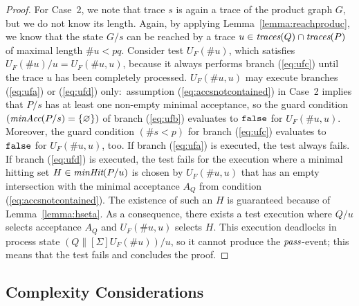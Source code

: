 \begin{proof}
For   Case~2, we note that trace $s$ is again a trace of the product graph
$G$, but we do not know its length. Again, by applying Lemma~\ref{lemma:reachproduc},
we know that the state   $G/s$ can   be reached by a trace
$u\in\text{\it traces}(Q)\cap\text{\it traces}(P)$ of maximal length $\#u < pq$. Consider test $U_F(\#
u)$, which satisfies $U_F(\# u)/u = U_F(\#u,u)$, because it always performs
branch (\ref{eq:ufc}) until the trace $u$ has been completely processed.
$U_F(\#u,u)$ may execute branches (\ref{eq:ufa}) or (\ref{eq:ufd})
only:~assumption (\ref{eq:accsnotcontained}) in Case~2 implies that $P/s$ has
at least one non-empty minimal acceptance, so the guard condition 
$(\text{\it minAcc}(P/s) = \{ \varnothing \})$ 
of branch (\ref{eq:ufb}) evaluates to $\mbox{{\tt false}}$ for $U_F(\#u,u)$.
Moreover, the guard condition $(\#s < p)$ for branch (\ref{eq:ufc}) evaluates
to $\mbox{{\tt false}}$ for $U_F(\#u,u)$, too. If branch (\ref{eq:ufa}) is executed, the
test always fails. If branch (\ref{eq:ufd}) is executed, the test fails for
the execution where a minimal hitting set $H\in\text{\it minHit}(P/u)$ is chosen
by $U_F(\#u,u)$ that has an empty intersection with the minimal acceptance
$A_Q$ from condition (\ref{eq:accsnotcontained}). The existence of such an
$H$ is guaranteed because of Lemma~\ref{lemma:hseta}. As a consequence, there
exists a test execution   where $Q/u$ selects acceptance $A_Q$ and
$U_F(\#u,u)$ selects $H$. This execution deadlocks in process state
$(Q\parallel[\Sigma]U_F(\# u))/u$, so it cannot produce the ${\text{\it pass}}$-event; 
this  means that the test fails and concludes the proof. \xbox
\end{proof}



\subsection{Complexity Considerations}
\label{sec:complexity}


